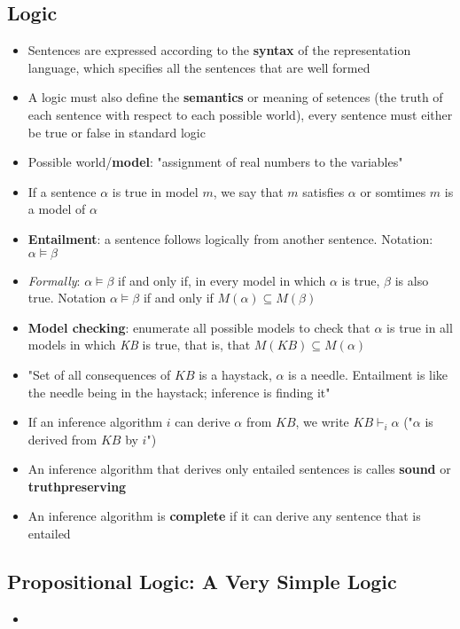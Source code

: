 \documentclass{scrartcl}
\begin{document}
\subsection{Logic} 
\begin{itemize}
    \item 
        Sentences are expressed according to the \textbf{syntax} of the representation language, which specifies all the sentences that are well formed
    \item
        A logic must also define the \textbf{semantics} or meaning of setences (the truth of each sentence with respect to each possible world), every sentence must either be true or false in standard logic
    \item
        Possible world/\textbf{model}: "assignment of real numbers to the variables"
    \item
        If a sentence $\alpha$ is true in model $m$, we say that $m$ satisfies $\alpha$ or somtimes $m$ is a model of $\alpha$
    \item
        \textbf{Entailment}: a sentence follows logically from another sentence. Notation: $\alpha \vDash \beta$
    \item
        \textit{Formally}: $\alpha \vDash \beta$ if and only if, in every model in which $\alpha$ is true, $\beta$ is also true. Notation $\alpha \vDash \beta$ if and only if $M(\alpha) \subseteq M(\beta)$
    \item
        \textbf{Model checking}: enumerate all possible models to check that $\alpha$ is true in all models in which \textit{KB} is true, that is, that $M(KB) \subseteq M(\alpha)$
    \item
        "Set of all consequences of $KB$ is a haystack, $\alpha$ is a needle. Entailment is like the needle being in the haystack; inference is finding it"
    \item
        If an inference algorithm $i$ can derive $\alpha$ from $KB$, we write $KB \vdash_{i} \alpha$ ("$\alpha$ is derived from $KB$ by $i$")
    \item
        An inference algorithm that derives only entailed sentences is calles \textbf{sound} or \textbf{truthpreserving}
    \item
        An inference algorithm is \textbf{complete} if it can derive any sentence that is entailed
\end{itemize}

\subsection{Propositional Logic: A Very Simple Logic}
\begin{itemize}
    \item
        
\end{itemize}
\end{document}

